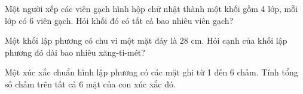 \begin{ex} %
Một người xếp các viên gạch hình hộp chữ nhật thành một khối gồm 4 lớp, mỗi lớp có 6 viên gạch. Hỏi khối đó có tất cả bao nhiêu viên gạch?
\end{ex}

\begin{ex} %
Một khối lập phương có chu vi một mặt đáy là $28\text{ cm}$. Hỏi cạnh của khối lập phương đó dài bao nhiêu xăng-ti-mét?
\end{ex}

\begin{ex} %
Một xúc xắc chuẩn hình lập phương có các mặt ghi từ 1 đến 6 chấm. Tính tổng số chấm trên tất cả 6 mặt của con xúc xắc đó.
\end{ex}
